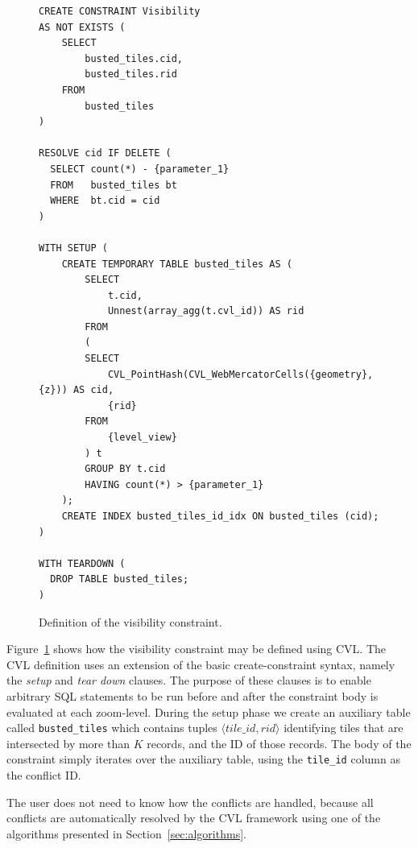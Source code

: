 \begin{figure}[htbp]
\begin{center}
\begin{lstlisting}
CREATE CONSTRAINT Visibility
AS NOT EXISTS (
    SELECT
        busted_tiles.cid,
        busted_tiles.rid
    FROM
        busted_tiles
)

RESOLVE cid IF DELETE (
  SELECT count(*) - {parameter_1}
  FROM   busted_tiles bt
  WHERE  bt.cid = cid
)

WITH SETUP (
    CREATE TEMPORARY TABLE busted_tiles AS (
        SELECT
            t.cid,
            Unnest(array_agg(t.cvl_id)) AS rid
        FROM
        (
        SELECT
            CVL_PointHash(CVL_WebMercatorCells({geometry}, {z})) AS cid,
            {rid}
        FROM
            {level_view}
        ) t
        GROUP BY t.cid
        HAVING count(*) > {parameter_1}
    );
    CREATE INDEX busted_tiles_id_idx ON busted_tiles (cid);
)

WITH TEARDOWN (
  DROP TABLE busted_tiles;
)
\end{lstlisting}
\caption{Definition of the visibility constraint.}
\label{fig:visibility:definition}
\end{center}
\end{figure}



Figure~\ref{fig:visibility:definition} shows how the visibility constraint may be defined using CVL. The CVL definition uses an extension of the basic create-constraint syntax, namely the \emph{setup} and \emph{tear down} clauses. 
The purpose of these clauses is to enable arbitrary SQL statements to be run before and after the constraint body is evaluated at each zoom-level. During the setup phase we create an auxiliary table called \texttt{busted\_tiles} which contains tuples $\langle tile\_id, rid \rangle$ identifying tiles that are intersected by more than $K$ records, and the ID of those records. The body of the constraint simply iterates over the auxiliary table, using the \texttt{tile\_id} column as the conflict ID.




The user does not need to know how the conflicts are handled, because all conflicts are automatically resolved by the CVL framework using one of the algorithms presented in Section~\ref{sec:algorithms}.




